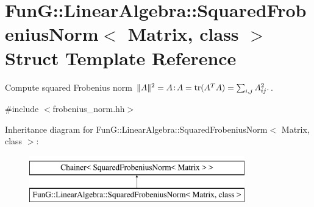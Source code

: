 \hypertarget{structFunG_1_1LinearAlgebra_1_1SquaredFrobeniusNorm}{}\section{FunG\+:\+:Linear\+Algebra\+:\+:Squared\+Frobenius\+Norm$<$ Matrix, class $>$ Struct Template Reference}
\label{structFunG_1_1LinearAlgebra_1_1SquaredFrobeniusNorm}


Compute squared Frobenius norm $ \|A\|^2 = A\negthinspace : \negthinspace A = \mathrm{tr}(A^TA) = \sum_{i,j} A_{ij}^2. $.  




{\ttfamily \#include $<$frobenius\+\_\+norm.\+hh$>$}

Inheritance diagram for FunG\+:\+:Linear\+Algebra\+:\+:Squared\+Frobenius\+Norm$<$ Matrix, class $>$\+:\begin{figure}[H]
\begin{center}
\leavevmode
\includegraphics[height=2.000000cm]{structFunG_1_1LinearAlgebra_1_1SquaredFrobeniusNorm}
\end{center}
\end{figure}
